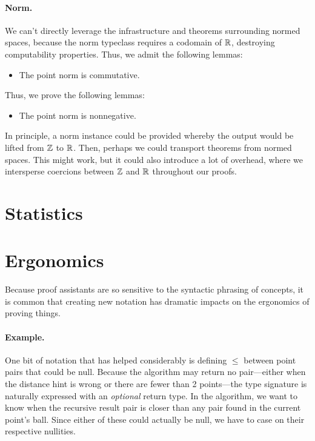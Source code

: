 \documentclass{article}
\begin{document}
\paragraph{Norm.}
We can't directly leverage the infrastructure and theorems surrounding normed spaces, because the norm typeclass requires a codomain of $\mathbb{R}$, destroying computability properties.
Thus, we admit the following lemmas:
\begin{itemize}
  \item The point norm is commutative.
\end{itemize}
Thus, we prove the following lemmas:
\begin{itemize}
  \item The point norm is nonnegative.
\end{itemize}
In principle, a norm instance could be provided whereby the output would be lifted from $\mathbb{Z}$ to $\mathbb{R}$.
Then, perhaps we could transport theorems from normed spaces.
This might work, but it could also introduce a lot of overhead, where we intersperse coercions between $\mathbb{Z}$ and $\mathbb{R}$ throughout our proofs.


\section{Statistics}

\section{Ergonomics}
Because proof assistants are so sensitive to the syntactic phrasing of concepts, it is common that creating new notation has dramatic impacts on the ergonomics of proving things.

\paragraph{Example.}
One bit of notation that has helped considerably is defining $\leq$ between point pairs that could be null.
Because the algorithm may return no pair---either when the distance hint is wrong or there are fewer than 2 points---the type signature is naturally expressed with an \textit{optional} return type.
In the algorithm, we want to know when the recursive result pair is closer than any pair found in the current point's ball.
Since either of these could actually be null, we have to case on their respective nullities.
\end{document}
